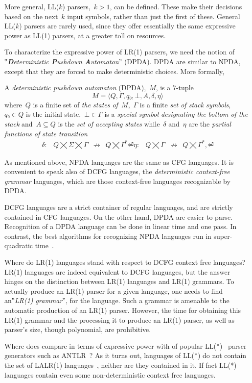 More general, LL($k$) parsers,~$k>1$, can be defined. These make their
  decisions based on the next~$k$ input symbols, rather than just the first of these.
  General LL($k$) parsers are rarely used, since they offer essentially 
    the same expressive power as LL(1) parsers, at a greater toll on resources.

To characterize the expressive power of LR(1) parsers, we need the notion
of ‟\emph{\textbf Deterministic \textbf Pushdown \textbf Automaton}” (DPDA).
DPDA are similar to NPDA, except that they are forced
  to make deterministic choices.
More formally,
\begin{Definition}
  \label{Definition:DPDA}
  A \emph{deterministic pushdown automaton} (DPDA),~$M$, is a 7-tuple
  \[
    M =⟨Q,Γ, q₀,⊥, A,δ,η⟩
  \]
  where~$Q$ is a finite set of
  \emph{the states of~$M$},~$Γ$ is a finite
  \emph{set of stack symbols},~$q₀∈Q$ is the initial state,~$⊥∈Γ$
  is a \emph{special symbol designating the bottom of the stack}
  and~$A⊆Q$ is the \emph{set of accepting states} while~$δ$ and~$η$ are
  the \emph{partial functions of state transition}
  \[
    \begin{array}{crlc}
      δ: & Q⨉Σ⨉Γ &↛& Q⨉Γ^*⏎
      η: & Q⨉Γ &↛& Q⨉Γ^*,⏎
    \end{array}
  \]
\end{Definition}

As mentioned above, NPDA languages are the same as CFG languages.
It is convenient to speak also of DCFG languages, the \emph{deterministic context-free grammar} languages,
  which are those context-free languages recognizable by DPDA.

DCFG languages are a strict container of regular languages, 
  and are strictly contained in CFG languages.
  On the other hand, DPDA are easier to parse. Recognition of a DPDA language
  can be done in linear time and one pass.
  In contrast, the best algorithms for recognizing NPDA languages run in super-quadratic time~\cite{CYK,I forget the nnames}.

Where do LR(1) languages stand with respect to DCFG context free languages?
LR(1) languages are indeed equivalent to DCFG languages, but
the answer hinges on the distinction
  between LR(1) languages and LR(1) grammars.
To actually produce an LR(1) parser for a given language,
  one needs to find an‟\emph{LR(1) grammar}”, for the language.
Such a grammar is amenable to
  the automatic production of an LR(1) parser.
However, the time for obtaining this LR(1) grammar and the processing it to produce an LR(1) parser,
  as well as parser's size,
  though polynomial, are prohibitive.

Where does \Self compare in terms of expressive power with of popular LL(*)~\cite{Parr:2011-is this where it was introduced? I doubt it was so soon} parser generators such
  as ANTLR~\cite{ANTLR}?
  As it turns out, languages of LL(*) do not contain the set of LALR(1) languages~\cite{Tomer check this},
neither are they contained in it. If fact LL(*) languages
  contain even some non-deterministic context free languages.